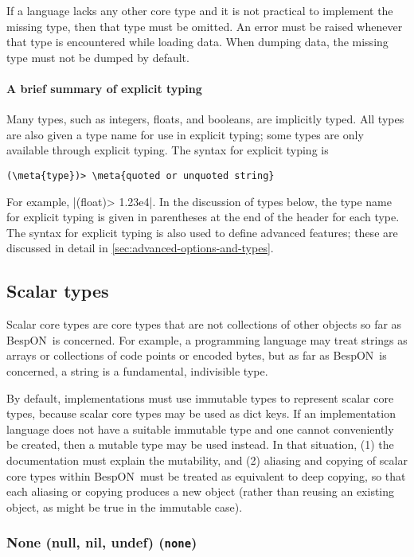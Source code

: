 \documentclass[11pt]{article}
\newcommand{\bespon}{BespON}
\newcommand{\meta}[1]{\ensuremath{\langle}\textit{#1}\ensuremath{\rangle}}
\begin{document}
If a language lacks any other core type and it is not practical to implement the missing type, then that type must be omitted.  An error must be raised whenever that type is encountered while loading data.  When dumping data, the missing type must not be dumped by default.


\paragraph{A brief summary of explicit typing}

Many types, such as integers, floats, and booleans, are implicitly typed.  All types are also given a type name for use in explicit typing; some types are only available through explicit typing.  The syntax for explicit typing is
\begin{Verbatim}[commandchars=\\\{\}]
(\meta{type})> \meta{quoted or unquoted string}
\end{Verbatim}
For example, |(float)> 1.23e4|.  In the discussion of types below, the type name for explicit typing is given in parentheses at the end of the header for each type.  The syntax for explicit typing is also used to define advanced features; these are discussed in detail in \cref{sec:advanced-options-and-types}.


\subsection{Scalar types}

Scalar core types are core types that are not collections of other objects so far as \bespon\ is concerned.  For example, a programming language may treat strings as arrays or collections of code points or encoded bytes, but as far as \bespon\ is concerned, a string is a fundamental, indivisible type.

By default, implementations must use immutable types to represent scalar core types, because scalar core types may be used as dict keys.  If an implementation language does not have a suitable immutable type and one cannot conveniently be created, then a mutable type may be used instead.  In that situation, (1) the documentation must explain the mutability, and (2) aliasing and copying of scalar core types within \bespon\ must be treated as equivalent to deep copying, so that each aliasing or copying produces a new object (rather than reusing an existing object, as might be true in the immutable case).


\subsubsection{None (null, nil, undef) (\texttt{none})}
\end{document}
